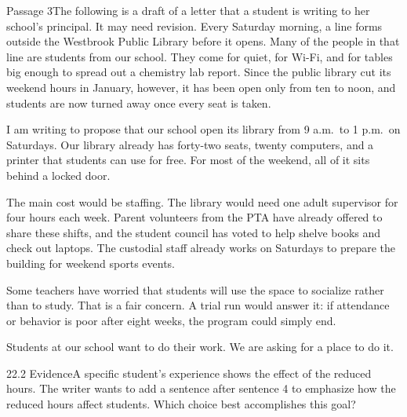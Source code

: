 \documentclass[11pt]{article}
\begin{document}
\begin{passage}{Passage 3}{The following is a draft of a letter that a student is writing to her school's principal. It may need revision.}
  Every Saturday morning, a line forms outside the Westbrook Public Library before it opens.  Many of the people in that line are students from our school.  They come for quiet, for Wi-Fi, and for tables big enough to spread out a chemistry lab report.  Since the public library cut its weekend hours in January, however, it has been open only from ten to noon, and students are now turned away once every seat is taken.

  I am writing to propose that our school open its library from 9 a.m.\ to 1 p.m.\ on Saturdays.  Our library already has forty-two seats, twenty computers, and a printer that students can use for free.  For most of the weekend, all of it sits behind a locked door.

  The main cost would be staffing.  The library would need one adult supervisor for four hours each week.  Parent volunteers from the PTA have already offered to share these shifts, and the student council has voted to help shelve books and check out laptops.  The custodial staff already works on Saturdays to prepare the building for weekend sports events.

  Some teachers have worried that students will use the space to socialize rather than to study.  That is a fair concern.  A trial run would answer it: if attendance or behavior is poor after eight weeks, the program could simply end.

  Students at our school want to do their work.  We are asking for a place to do it.
\end{passage}

\begin{q}{2}{2.2 Evidence}{A specific student's experience shows the effect of the reduced hours.}
The writer wants to add a sentence after sentence 4 to emphasize how the reduced hours affect students. Which choice best accomplishes this goal?
\end{q}
\end{document}
